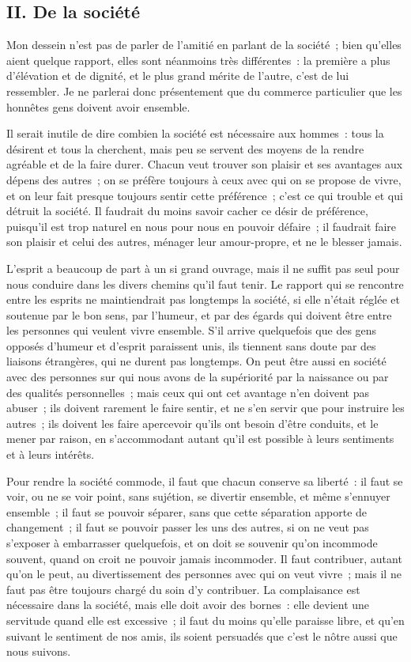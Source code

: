 \documentclass[french,twoside]{book} %
\begin{document}
\subsection[{II. De la société}]{II. De la société}
\noindent Mon dessein n’est pas de parler de l’amitié en parlant de la société ; bien qu’elles aient quelque rapport, elles sont néanmoins très différentes : la première a plus d’élévation et de dignité, et le plus grand mérite de l’autre, c’est de lui ressembler. Je ne parlerai donc présentement que du commerce particulier que les honnêtes gens doivent avoir ensemble.\par
Il serait inutile de dire combien la société est nécessaire aux hommes : tous la désirent et tous la cherchent, mais peu se servent des moyens de la rendre agréable et de la faire durer. Chacun veut trouver son plaisir et ses avantages aux dépens des autres ; on se préfère toujours à ceux avec qui on se propose de vivre, et on leur fait presque toujours sentir cette préférence ; c’est ce qui trouble et qui détruit la société. Il faudrait du moins savoir cacher ce désir de préférence, puisqu’il est trop naturel en nous pour nous en pouvoir défaire ; il faudrait faire son plaisir et celui des autres, ménager leur amour-propre, et ne le blesser jamais.\par
L’esprit a beaucoup de part à un si grand ouvrage, mais il ne suffit pas seul pour nous conduire dans les divers chemins qu’il faut tenir. Le rapport qui se rencontre entre les esprits ne maintiendrait pas longtemps la société, si elle n’était réglée et soutenue par le bon sens, par l’humeur, et par des égards qui doivent être entre les personnes qui veulent vivre ensemble. S’il arrive quelquefois que des gens opposés d’humeur et d’esprit paraissent unis, ils tiennent sans doute par des liaisons étrangères, qui ne durent pas longtemps. On peut être aussi en société avec des personnes sur qui nous avons de la supériorité par la naissance ou par des qualités personnelles ; mais ceux qui ont cet avantage n’en doivent pas abuser ; ils doivent rarement le faire sentir, et ne s’en servir que pour instruire les autres ; ils doivent les faire apercevoir qu’ils ont besoin d’être conduits, et le mener par raison, en s’accommodant autant qu’il est possible à leurs sentiments et à leurs intérêts.\par
Pour rendre la société commode, il faut que chacun conserve sa liberté : il faut se voir, ou ne se voir point, sans sujétion, se divertir ensemble, et même s’ennuyer ensemble ; il faut se pouvoir séparer, sans que cette séparation apporte de changement ; il faut se pouvoir passer les uns des autres, si on ne veut pas s’exposer à embarrasser quelquefois, et on doit se souvenir qu’on incommode souvent, quand on croit ne pouvoir jamais incommoder. Il faut contribuer, autant qu’on le peut, au divertissement des personnes avec qui on veut vivre ; mais il ne faut pas être toujours chargé du soin d’y contribuer. La complaisance est nécessaire dans la société, mais elle doit avoir des bornes : elle devient une servitude quand elle est excessive ; il faut du moins qu’elle paraisse libre, et qu’en suivant le sentiment de nos amis, ils soient persuadés que c’est le nôtre aussi que nous suivons.\par
\end{document}
